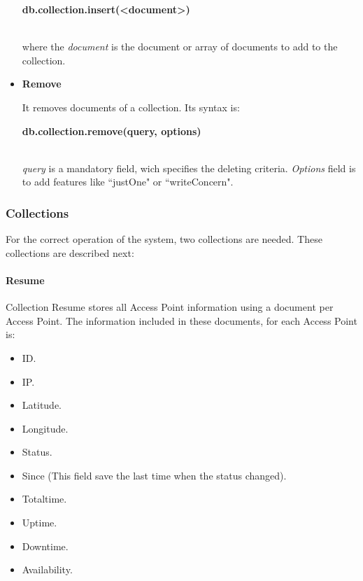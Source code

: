 \documentclass[12pt, a4paper,twoside]{tesi_upf}
\begin{document}
\begin{itemize}
            \centerline{\textbf{db.collection.insert(\textless document\textgreater)}}\\
            where the \textit{document} is the document or array of documents to add to the collection.
                
            \item \textbf{Remove}
            
            It removes documents of a collection. Its syntax is:\\
            
            \centerline{\textbf{db.collection.remove(query, options)}}\\
            
            \textit{query} is a mandatory field, wich specifies the deleting criteria. \textit{Options} field is to add features like ``justOne" or ``writeConcern".
            
            
            \end{itemize}

            \subsubsection{Collections}
            
            For the correct operation of the system, two collections are needed. These collections are described next:
            \paragraph{Resume}
            
            Collection Resume stores all Access Point information using a document per Access Point. The information included in these documents, for each Access Point is: 
            \begin{itemize}
            \item ID.
            \item IP.
            \item Latitude.
            \item Longitude.
            \item Status.
            \item Since (This field save the last time when the status changed).
            \item Totaltime.
            \item Uptime.
            \item Downtime.
            \item Availability.
            \end{itemize}
            
\end{document}
